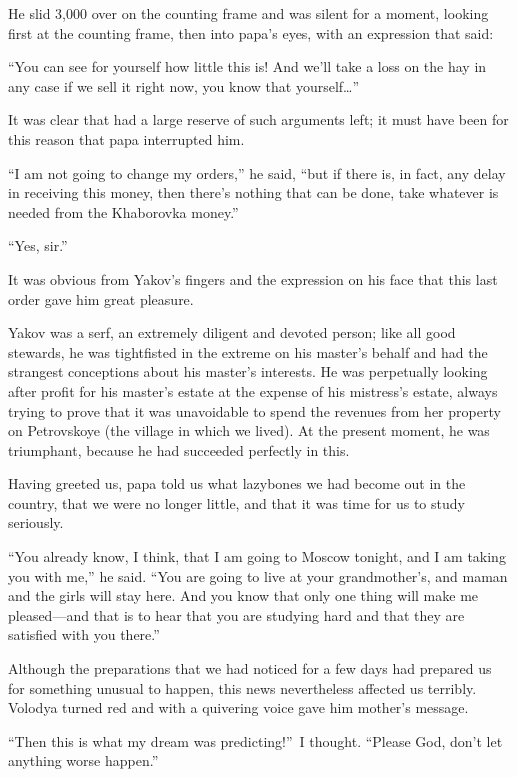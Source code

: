 He slid 3,000 over on the counting frame and was silent for a moment, looking first at the counting frame, then into papa's eyes, with an expression that said:

``You can see for yourself how little this is! And we'll take a loss on the hay in any case if we sell it right now, you know that yourself\ldots{}'' %

It was clear that had a large reserve of such arguments left; it must have been for this reason that papa interrupted him.

``I am not going to change my orders,'' he said, ``but if there is, in fact, any delay in receiving this money, then there's nothing that can be done, take whatever is needed from the Khaborovka money.'' %

``Yes, sir.'' %

It was obvious from Yakov's fingers and the expression on his face that this last order gave him great pleasure.

Yakov was a serf, an extremely diligent and devoted person; like all good stewards, he was tightfisted in the extreme on his master's behalf and had the strangest conceptions about his master's interests. He was perpetually looking after profit for his master's estate at the expense of his mistress's estate, always trying to prove that it was unavoidable to spend the revenues from her property on Petrovskoye (the village in which we lived). At the present moment, he was triumphant, because he had succeeded perfectly in this.

Having greeted us, papa told us what lazybones we had become out in the country, that we were no longer little, and that it was time for us to study seriously.

``You already know, I think, that I am going to Moscow tonight, and I am taking you with me,'' he said. ``You are going to live at your grandmother's, and maman and the girls will stay here. And you know that only one thing will make me pleased---and that is to hear that you are studying hard and that they are satisfied with you there.'' %

Although the preparations that we had noticed for a few days had prepared us for something unusual to happen, this news nevertheless affected us terribly. Volodya turned red and with a quivering voice gave him mother's message.

``Then this is what my dream was predicting!''~I thought. ``Please God, don't let anything worse happen.'' %

